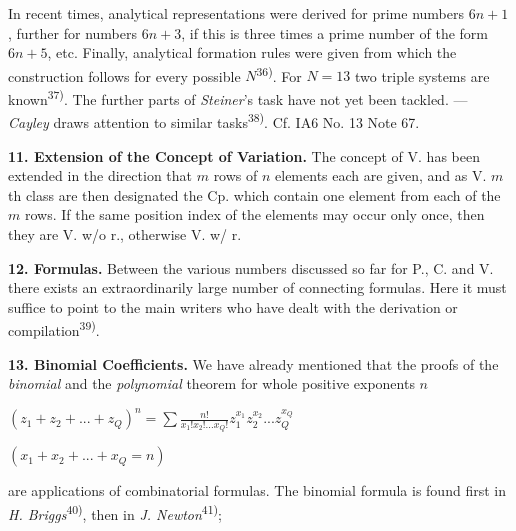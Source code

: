 \thispagestyle{fancy}

\vspace{0.5cm}

In recent times, analytical representations were derived for prime numbers $6n+1$, further for numbers $6n+3$, if this is three times a prime number of the form $6n+5$, etc. Finally, analytical formation rules were given from which the construction follows for every possible $N$\textsuperscript{36)}. For $N=13$ two triple systems are known\textsuperscript{37)}. The further parts of \textit{Steiner}'s task have not yet been tackled. — \textit{Cayley} draws attention to similar tasks\textsuperscript{38)}. Cf. IA6 No. 13 Note 67.

\vspace{0.3cm}

\textbf{11. Extension of the Concept of Variation.} The concept of V. has been extended in the direction that $m$ rows of $n$ elements each are given, and as V. $m$th class are then designated the Cp. which contain one element from each of the $m$ rows. If the same position index of the elements may occur only once, then they are V. w/o r., otherwise V. w/ r.

\vspace{0.3cm}

\textbf{12. Formulas.} Between the various numbers discussed so far for P., C. and V. there exists an extraordinarily large number of connecting formulas. Here it must suffice to point to the main writers who have dealt with the derivation or compilation\textsuperscript{39)}.

\vspace{0.3cm}

\textbf{13. Binomial Coefficients.} We have already mentioned that the proofs of the \textit{binomial} and the \textit{polynomial} theorem for whole positive exponents $n$

\begin{center}
    $(z_1+z_2+...+z_Q)^n = \sum \frac{n!}{x_1!x_2!...x_Q!} z_1^{x_1}z_2^{x_2}...z_Q^{x_Q}$
    
    $(x_1+x_2+...+x_Q=n)$
\end{center}

are applications of combinatorial formulas. The binomial formula is found first in \textit{H. Briggs}\textsuperscript{40)}, then in \textit{J. Newton}\textsuperscript{41)};


